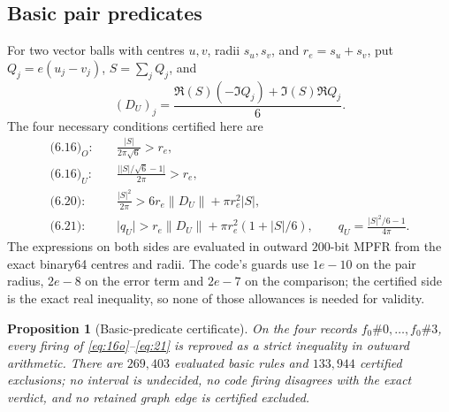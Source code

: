 \documentclass[10pt]{article}
\newtheorem{proposition}[theorem]{Proposition}
\theoremstyle{definition}
\newcommand{\norm}[1]{\lVert #1\rVert}
\newcommand{\abs}[1]{\lvert #1\rvert}
\begin{document}
\subsection{Basic pair predicates}

For two vector balls with centres $u,v$, radii $s_u,s_v$, and $r_e=s_u+s_v$, put $Q_j=e(u_j-v_j)$, $S=\sum_jQ_j$, and
\[
(D_U)_j=\frac{\Re(S)(-\Im Q_j)+\Im(S)\Re Q_j}{6}.
\]
The four necessary conditions certified here are
\begin{align}
\text{(6.16)}_O:&\quad \frac{\abs S}{2\pi\sqrt6}>r_e,\label{eq:16o}\\
\text{(6.16)}_U:&\quad \frac{\abs{\abs S/\sqrt6-1}}{2\pi}>r_e,\label{eq:16u}\\
\text{(6.20)}:&\quad \frac{\abs S^2}{2\pi}>6r_e\norm{D_U}+\pi r_e^2\abs S,\label{eq:20}\\
\text{(6.21)}:&\quad \abs{q_U}>r_e\norm{D_U}+\pi r_e^2(1+\abs S/6),\qquad q_U=\frac{\abs S^2/6-1}{4\pi}.\label{eq:21}
\end{align}
The expressions on both sides are evaluated in outward $200$-bit MPFR from the exact binary64 centres and radii. The code's guards use $1e-10$ on the pair radius, $2e-8$ on the error term and $2e-7$ on the comparison; the certified side is the exact real inequality, so none of those allowances is needed for validity.

\begin{proposition}[Basic-predicate certificate]\label{prop:basic}
On the four records $f_0\#0,\ldots,f_0\#3$, every firing of \eqref{eq:16o}--\eqref{eq:21} is reproved as a strict inequality in outward arithmetic. There are $269{,}403$ evaluated basic rules and $133{,}944$ certified exclusions; no interval is undecided, no code firing disagrees with the exact verdict, and no retained graph edge is certified excluded.
\end{proposition}
\end{document}
